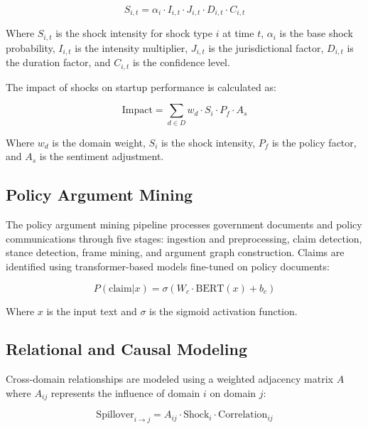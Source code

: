 \documentclass[conference]{IEEEtran}
\begin{document}
\begin{equation}
S_{i,t} = \alpha_i \cdot I_{i,t} \cdot J_{i,t} \cdot D_{i,t} \cdot C_{i,t}
\end{equation}

Where $S_{i,t}$ is the shock intensity for shock type $i$ at time $t$, $\alpha_i$ is the base shock probability, $I_{i,t}$ is the intensity multiplier, $J_{i,t}$ is the jurisdictional factor, $D_{i,t}$ is the duration factor, and $C_{i,t}$ is the confidence level.

The impact of shocks on startup performance is calculated as:

\begin{equation}
\text{Impact} = \sum_{d \in D} w_d \cdot S_i \cdot P_f \cdot A_s
\end{equation}

Where $w_d$ is the domain weight, $S_i$ is the shock intensity, $P_f$ is the policy factor, and $A_s$ is the sentiment adjustment.

\subsection{Policy Argument Mining}

The policy argument mining pipeline processes government documents and policy communications through five stages: ingestion and preprocessing, claim detection, stance detection, frame mining, and argument graph construction. Claims are identified using transformer-based models fine-tuned on policy documents:

\begin{equation}
P(\text{claim}|x) = \sigma(W_c \cdot \text{BERT}(x) + b_c)
\end{equation}

Where $x$ is the input text and $\sigma$ is the sigmoid activation function.

\subsection{Relational and Causal Modeling}

Cross-domain relationships are modeled using a weighted adjacency matrix $A$ where $A_{ij}$ represents the influence of domain $i$ on domain $j$:

\begin{equation}
\text{Spillover}_{i \rightarrow j} = A_{ij} \cdot \text{Shock}_i \cdot \text{Correlation}_{ij}
\end{equation}
\end{document}
